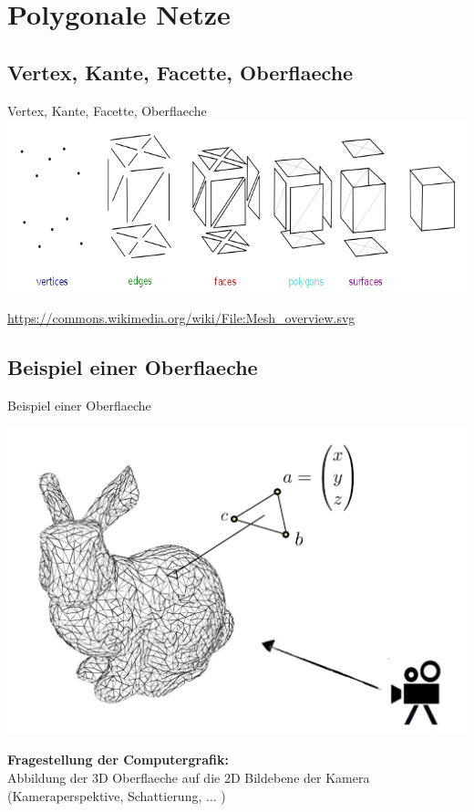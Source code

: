 \documentclass[10pt,aspectratio=169]{beamer}
\begin{document}
  \section{Polygonale Netze}
  \subsection{Vertex, Kante, Facette, Oberflaeche}
  \begin{frame}{Vertex, Kante, Facette, Oberflaeche}
    \hspace{0.65cm}\includegraphics[scale=0.5]{mesh}
    \begin{center}
      \footnotesize \url{https://commons.wikimedia.org/wiki/File:Mesh_overview.svg}  
    \end{center}
  \end{frame}

  \subsection{Beispiel einer Oberflaeche}
  \begin{frame}{Beispiel einer Oberflaeche}
    \begin{center}
      \includegraphics[scale=0.125]{bunny}
    \end{center}
    \textbf{Fragestellung der Computergrafik:}\\
    Abbildung der 3D Oberflaeche auf die 2D Bildebene der Kamera\\
    (Kameraperspektive, Schattierung, ... )
  \end{frame}
\end{document}
